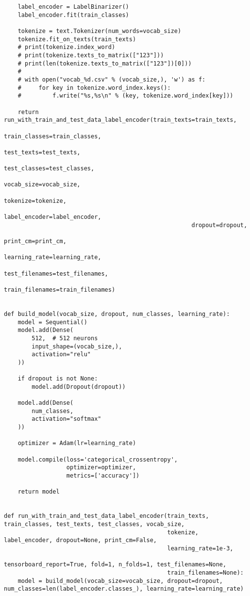 \begin{verbatim}
    label_encoder = LabelBinarizer()
    label_encoder.fit(train_classes)

    tokenize = text.Tokenizer(num_words=vocab_size)
    tokenize.fit_on_texts(train_texts)
    # print(tokenize.index_word)
    # print(tokenize.texts_to_matrix(["123"]))
    # print(len(tokenize.texts_to_matrix(["123"])[0]))
    #
    # with open("vocab_%d.csv" % (vocab_size,), 'w') as f:
    #     for key in tokenize.word_index.keys():
    #         f.write("%s,%s\n" % (key, tokenize.word_index[key]))

    return run_with_train_and_test_data_label_encoder(train_texts=train_texts,
                                                      train_classes=train_classes,
                                                      test_texts=test_texts,
                                                      test_classes=test_classes,
                                                      vocab_size=vocab_size,
                                                      tokenize=tokenize,
                                                      label_encoder=label_encoder,
                                                      dropout=dropout,
                                                      print_cm=print_cm,
                                                      learning_rate=learning_rate,
                                                      test_filenames=test_filenames,
                                                      train_filenames=train_filenames)


def build_model(vocab_size, dropout, num_classes, learning_rate):
    model = Sequential()
    model.add(Dense(
        512,  # 512 neurons
        input_shape=(vocab_size,),
        activation="relu"
    ))

    if dropout is not None:
        model.add(Dropout(dropout))

    model.add(Dense(
        num_classes,
        activation="softmax"
    ))

    optimizer = Adam(lr=learning_rate)

    model.compile(loss='categorical_crossentropy',
                  optimizer=optimizer,
                  metrics=['accuracy'])

    return model


def run_with_train_and_test_data_label_encoder(train_texts, train_classes, test_texts, test_classes, vocab_size,
                                               tokenize, label_encoder, dropout=None, print_cm=False,
                                               learning_rate=1e-3,
                                               tensorboard_report=True, fold=1, n_folds=1, test_filenames=None,
                                               train_filenames=None):
    model = build_model(vocab_size=vocab_size, dropout=dropout, num_classes=len(label_encoder.classes_), learning_rate=learning_rate)


\end{verbatim}
